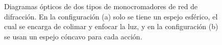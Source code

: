 \begin{figure}[h]
	\centering
	\label{fig:Configuraciones}
	\caption[Diagramas ópticos de dos tipos de monocromadores de red de difracción.]{Diagramas ópticos de dos tipos de monocromadores de red de difracción. En la configuración (a) solo se tiene un espejo esférico, el cual se encarga de colimar y enfocar la luz, y en la configuración (b) se usan un espejo cóncavo para cada acción. \cite{Gratings2008}} 
	
\end{figure}


